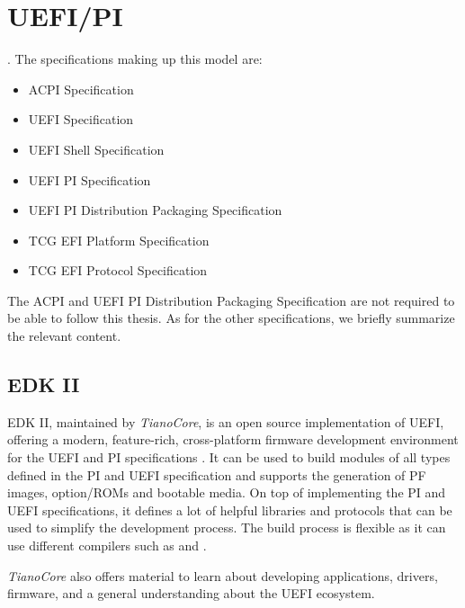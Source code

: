 
\chapter{\acs{UEFI}/\acs{PI}}

.
The specifications making up this model are:

\begin{itemize}
    \item \acs{ACPI} Specification
    \item \acs{UEFI} Specification
    \item \acs{UEFI} Shell Specification
    \item \acs{UEFI} \acs{PI} Specification
    \item \acs{UEFI} \acs{PI} Distribution Packaging Specification
    \item \acs{TCG} \acs{EFI} Platform Specification
    \item \acs{TCG} \acs{EFI} Protocol Specification
\end{itemize}

The \ac{ACPI} and \ac{UEFI} \ac{PI} Distribution Packaging Specification are not required to be able to follow this thesis.
As for the other specifications, we briefly summarize the relevant content.


\clearpage


\clearpage


\clearpage

\clearpage


\section{\acs{EDK} II}

\ac{EDK} II, maintained by \emph{TianoCore}, is an open source implementation of \ac{UEFI}, offering a modern, feature-rich, cross-platform firmware development environment for the \ac{UEFI} and \ac{PI} specifications \cite{tianocore}.
It can be used to build modules of all types defined in the \ac{PI} and \ac{UEFI} specification and supports the generation of \ac{PF} images, option\-/\acp{ROM} and bootable media.
On top of implementing the \ac{PI} and \ac{UEFI} specifications, it defines a lot of helpful libraries and protocols that can be used to simplify the development process.
The build process is flexible as it can use different compilers such as  and .

\emph{TianoCore} also offers material to learn about developing applications, drivers, firmware, and a general understanding about the \ac{UEFI} ecosystem.
